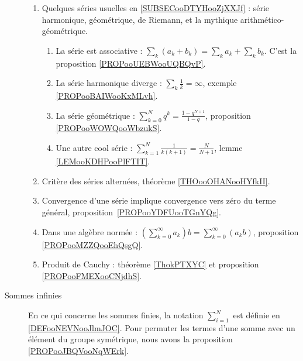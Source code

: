 \begin{description}
	      \begin{enumerate}
		      \item
		            Quelques séries usuelles en \ref{SUBSECooDTYHooZjXXJf} : série harmonique, géométrique, de Riemann, et la mythique arithmético-géométrique.
		            \begin{enumerate}
			            \item
			                  La série est associative : \( \sum_k(a_k+b_k)=\sum_ka_k+\sum_kb_k\). C'est la proposition \ref{PROPooUEBWooUQBQvP}.
			            \item
			                  La série harmonique diverge : \( \sum_k\frac{1}{ k }=\infty\), exemple \ref{PROPooBAIWooKxMLvh}.
			            \item
			                  La série géométrique : \( \sum_{k=0}^Nq^k=\frac{ 1-q^{N+1} }{ 1-q }\), proposition \ref{PROPooWOWQooWbzukS}.
			            \item
			                  Une autre cool série : \( \sum_{k=1}^N\frac{ 1 }{ k(k+1) }=\frac{ N }{ N+1 }\), lemme \ref{LEMooKDHPooPlFTIT}.
		            \end{enumerate}
		      \item
		            Critère des séries alternées, théorème \ref{THOooOHANooHYfkII}.
		      \item
		            Convergence d'une série implique convergence vers zéro du terme général, proposition~\ref{PROPooYDFUooTGnYQg}.
		      \item
		            Dans une algèbre normée : \( (\sum_{k=0}^{\infty}a_k)b=\sum_{k=0}^{\infty}(a_kb)\), proposition \ref{PROPooMZZQooEhQsgQ}.
		      \item
		            Produit de Cauchy : théorème \ref{ThokPTXYC} et proposition \ref{PROPooFMEXooCNjdhS}.
	      \end{enumerate}

	\item[Sommes infinies]
	      En ce qui concerne les sommes finies, la notation \( \sum_{i=1}^N\) est définie en \ref{DEFooNEVNooJlmJOC}. Pour permuter les termes d'une somme avec un élément du groupe symétrique, nous avons la proposition \ref{PROPooJBQVooNqWErk}.


\end{description}
